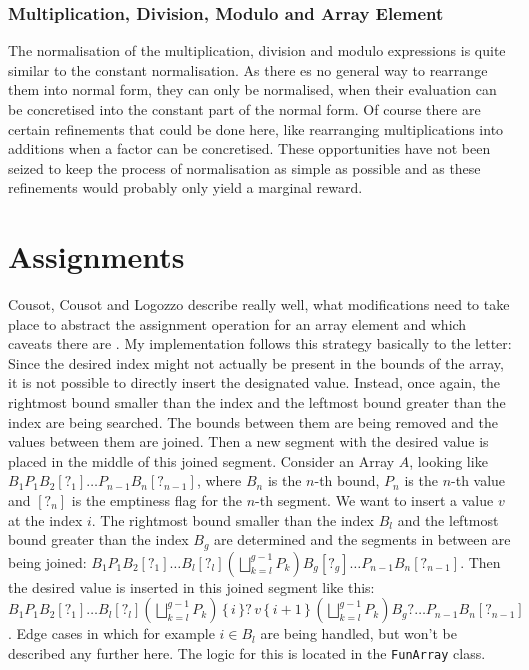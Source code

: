 \subsubsection{Multiplication, Division, Modulo and Array Element}

The normalisation of the multiplication, division and modulo expressions is quite similar to the constant normalisation. As there es no general way to rearrange them into normal form, they can only be normalised, when their evaluation can be concretised into the constant part of the normal form. Of course there are certain refinements that could be done here, like rearranging multiplications into additions when a factor can be concretised. These opportunities have not been seized to keep the process of normalisation as simple as possible and as these refinements would probably only yield a marginal reward. 








\section{Assignments}\label{sec:assignments}

Cousot, Cousot and Logozzo describe really well, what modifications need to take place to abstract the assignment operation for an array element and which caveats there are \cite[section 11.6]{cousot2011}. My implementation follows this strategy basically to the letter:
Since the desired index might not actually be present in the bounds of the array, it is not possible to directly insert the designated value. Instead, once again, the rightmost bound smaller than the index and the leftmost bound greater than the index are being searched. The bounds between them are being removed and the values between them are joined. Then a new segment with the desired value is placed in the middle of this joined segment. Consider an Array $A$, looking like $B_1P_1B_2[?_1]\ldots P_{n-1}B_n[?_{n-1}]$, where $B_n$ is the $n$-th bound, $P_n$ is the $n$-th value and $[?_{n}]$ is the emptiness flag for the $n$-th segment. We want to insert a value $v$ at the index $i$. The rightmost bound smaller than the index $B_l$ and the leftmost bound greater than the index $B_g$ are determined and the segments in between are being joined: $B_1P_1B_2[?_1]\ldots B_l[?_l] (\bigsqcup^{g-1}_{k=l}P_k) B_g[?_g]\ldots P_{n-1}B_n[?_{n-1}]$. Then the desired value  is inserted in this joined segment like this: $B_1P_1B_2[?_1]\ldots\allowbreak B_l[?_l] (\bigsqcup^{g-1}_{k=l}P_k)\allowbreak\, \{\,i\,\}?\, v \allowbreak\,\{\,i+1\,\}\, \allowbreak(\bigsqcup^{g-1}_{k=l}P_k) B_g?\ldots \allowbreak P_{n-1}B_n[?_{n-1}]$. Edge cases in which for example $i\in B_l$ are being handled, but won't be described any further here.  The logic for this is located in the \texttt{FunArray} class. 

